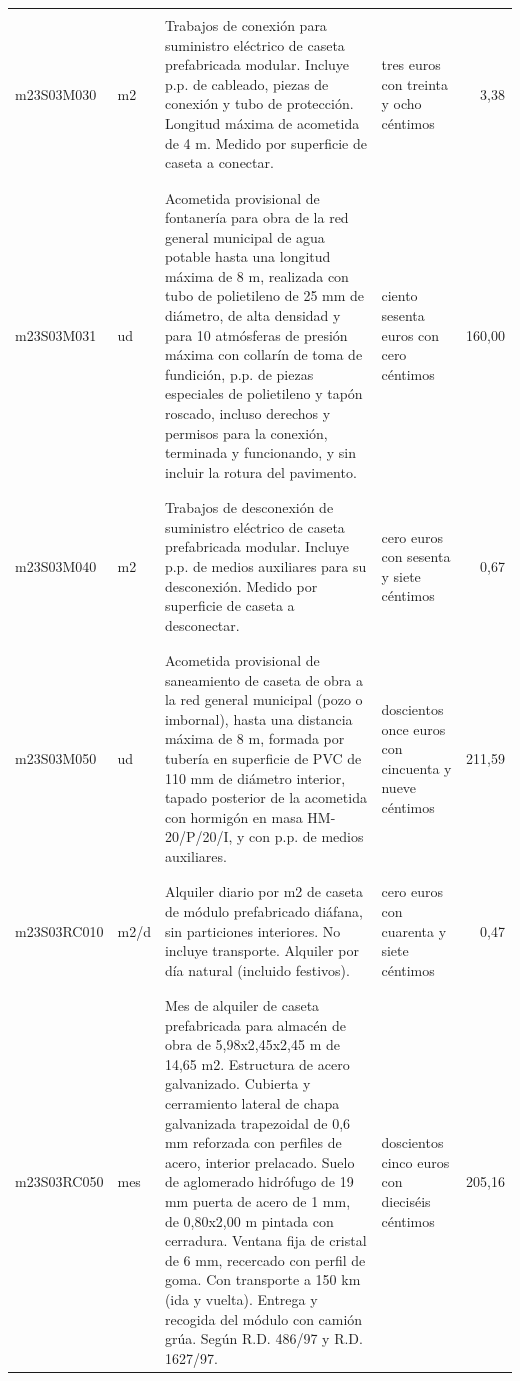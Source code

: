 \documentclass{book}%
\begin{document}
\begin{longtable}{|l|l|p{5cm}|p{3cm}|r|}
&&&&\\%
m23S03M030&m2&Trabajos de conexión para suministro eléctrico de caseta prefabricada modular. Incluye p.p. de cableado, piezas de conexión y tubo de protección. Longitud máxima de acometida de 4 m. Medido por superficie de caseta a conectar.&tres euros con treinta y ocho céntimos&3,38\\%
&&&&\\%
&&&&\\%
m23S03M031&ud&Acometida provisional de fontanería para obra de la red general municipal de agua potable hasta una longitud máxima de 8 m, realizada con tubo de polietileno de 25 mm de diámetro, de alta densidad y para 10 atmósferas de presión máxima con collarín de toma de fundición, p.p. de piezas especiales de polietileno y tapón roscado, incluso derechos y permisos para la conexión, terminada y funcionando, y sin incluir la rotura del pavimento.&ciento sesenta euros con cero céntimos&160,00\\%
&&&&\\%
&&&&\\%
m23S03M040&m2&Trabajos de desconexión de suministro eléctrico de caseta prefabricada modular. Incluye p.p. de medios auxiliares para su desconexión. Medido por superficie de caseta a desconectar.&cero euros con sesenta y siete céntimos&0,67\\%
&&&&\\%
&&&&\\%
m23S03M050&ud&Acometida provisional de saneamiento de caseta de obra a la red general municipal (pozo o imbornal), hasta una distancia máxima de 8 m, formada por tubería en superficie de PVC de 110 mm de diámetro interior, tapado posterior de la acometida con hormigón en masa HM{-}20/P/20/I, y con p.p. de medios auxiliares.&doscientos once euros con cincuenta y nueve céntimos&211,59\\%
&&&&\\%
&&&&\\%
m23S03RC010&m2/d&Alquiler diario por m2 de caseta de módulo prefabricado diáfana, sin particiones interiores. No incluye transporte. Alquiler por día natural (incluido festivos).&cero euros con cuarenta y siete céntimos&0,47\\%
&&&&\\%
&&&&\\%
m23S03RC050&mes&Mes de alquiler de caseta prefabricada para almacén de obra de 5,98x2,45x2,45 m de 14,65 m2. Estructura de acero galvanizado. Cubierta y cerramiento lateral de chapa galvanizada trapezoidal de 0,6 mm reforzada con perfiles de acero, interior prelacado. Suelo de aglomerado hidrófugo de 19 mm puerta de acero de 1 mm, de 0,80x2,00 m pintada con cerradura. Ventana fija de cristal de 6 mm, recercado con perfil de goma. Con transporte a 150 km (ida y vuelta). Entrega y recogida del módulo con camión grúa. Según R.D. 486/97 y R.D. 1627/97.&doscientos cinco euros con dieciséis céntimos&205,16\\%

\end{longtable}
\end{document}
